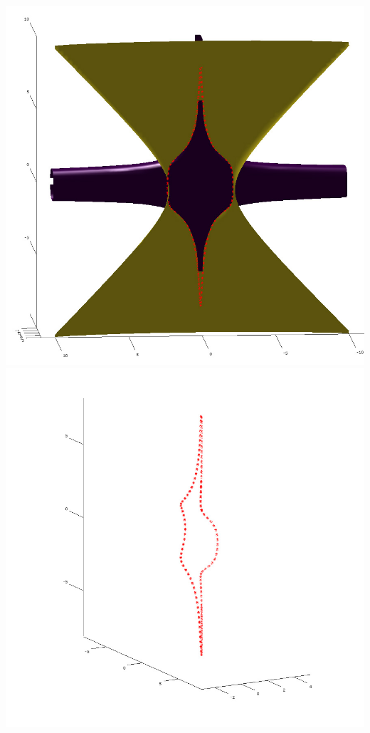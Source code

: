 \documentclass[]{article}
\begin{document}
	\includegraphics[scale=0.3]{primer4_2}
	\includegraphics[scale=0.3]{primer4_4}
\end{document}
